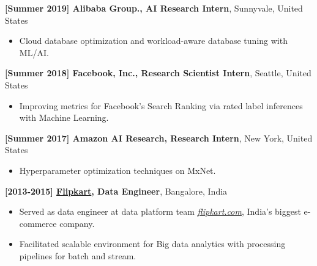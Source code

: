 \documentclass[8pt]{article}
\newenvironment{outerlist}[1][\enskip\textbullet]%
        {\begin{itemize}[#1]}{\end{itemize}%
         \vspace{-.6\baselineskip}}
\begin{document}
\textbf{[Summer 2019] Alibaba Group., AI Research Intern}, Sunnyvale, United States
\vspace{-2mm}
\begin{outerlist}
\item[] Cloud database optimization and workload-aware database tuning with ML/AI.
\end{outerlist}
\vspace{1mm}

\textbf{[Summer 2018] Facebook, Inc., Research Scientist Intern}, Seattle, United States
\vspace{-2mm}
\begin{outerlist}
\item[] Improving metrics for Facebook's Search Ranking via rated label inferences with Machine Learning.
\end{outerlist}
\vspace{1mm}

\textbf{[Summer 2017] Amazon AI Research, Research Intern}, New York, United States
\vspace{-2mm}
\begin{outerlist}
\item[] Hyperparameter optimization techniques on {\sc MxNet}.
\end{outerlist}
\vspace{1mm}

\textbf{[2013-2015] \href{http://www.flipkart.com/}{Flipkart}, Data Engineer}, Bangalore, India
\vspace{-2mm}
\begin{outerlist}
\item[] Served as data engineer at data platform team \href{http://www.flipkart.com}{\emph{flipkart.com}}, India's biggest e-commerce company.\\ [-6mm]
\item[] Facilitated scalable environment for Big data analytics with processing pipelines for batch and stream.
\end{outerlist}
\end{document}
